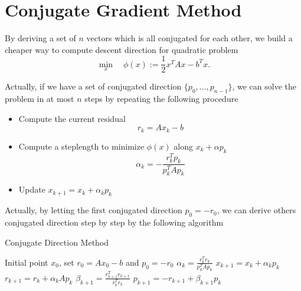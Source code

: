 \documentclass[11pt]{report}
\begin{document}
\section{Conjugate Gradient Method}
By deriving a set of $n$ vectors which is all conjugated for each other, we build a cheaper way to compute descent direction for quadratic problem
\begin{equation}
    \min_x \quad \phi(x) := \frac{1}{2}x^TAx - b^Tx.
\end{equation}

Actually, if we have a set of conjugated direction $\{p_0,\dots,p_{n-1}\}$, we can solve the problem in at most $n$ steps by repeating the following procedure
\begin{itemize}
    \item Compute the current residual
    \begin{equation}
        r_k = Ax_k - b
    \end{equation}
    \item Compute a steplength to minimize $\phi(x)$ along $x_k+\alpha p_k$
    \begin{equation}
        \alpha_k = -\frac{r_k^Tp_k}{p_k^TAp_k}
    \end{equation}
    \item Update $x_{k+1} = x_k +\alpha_k p_k$
\end{itemize}

Actually, by letting the first conjugated direction $p_0= -r_0$, we can derive others conjugated direction step by step by the following algorithm
\begin{algorithm}[H]
\caption{Conjugate Direction Method}
\label{alg:Conjugate Direction Method}
\begin{algorithmic}[1]
\REQUIRE Initial point $x_0$, set $r_0 = Ax_0-b$ and $p_0=-r_0$
\REPEAT
\STATE $\alpha_k = \frac{r_k^Tr_k}{p_k^TAp_k}$
\STATE $ x_{k+1} = x_k + \alpha_kp_k$
\STATE $ r_{k+1} = r_k + \alpha_kAp_k$
\STATE $ \beta_{k+1} = \frac{r_{k+1}^Tr_{k+1}}{r_k^Tr_k}$
\STATE $ p_{k+1} = -r_{k+1} + \beta_{k+1}p_k$
\end{algorithmic}
\end{algorithm}
\end{document}
